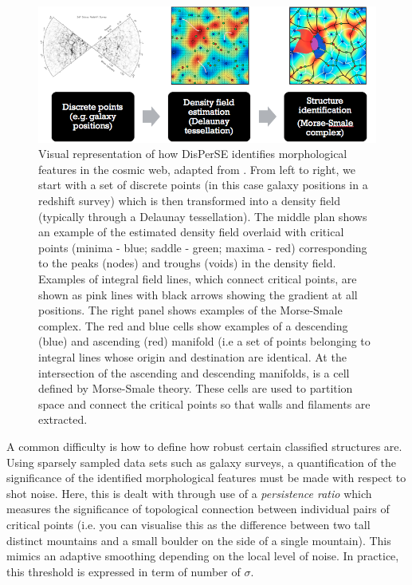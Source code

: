 \begin{figure}
    \centering
	\includegraphics[width=\linewidth]{thesis/latex/introduction/disperse_visual.png}
    \caption{Visual representation of how DisPerSE identifies morphological features in the cosmic web, adapted from \citet{sousbie2011a}. From left to right, we start with a set of discrete points (in this case galaxy positions in a redshift survey) which is then transformed into a density field (typically through a Delaunay tessellation). The middle plan shows an example of the estimated density field overlaid with critical points (minima - blue; saddle - green; maxima - red) corresponding to the peaks (nodes) and troughs (voids) in the density field. Examples of integral field lines, which connect critical points, are shown as pink lines with black arrows showing the gradient at all positions. The right panel shows examples of the Morse-Smale complex. The red and blue cells show examples of a descending (blue) and ascending (red) manifold (i.e a set of points belonging to integral lines whose origin and destination are identical. At the intersection of the ascending and descending manifolds, is a cell defined by Morse-Smale theory. These cells are used to partition space and connect the critical points so that walls and filaments are extracted.}
    \label{fig:disperse_visual}
\end{figure}

A common difficulty is how to define how robust certain classified structures are. Using sparsely sampled data sets such as galaxy surveys, a quantification of the significance of the identified morphological features must be made with respect to shot noise. Here, this is dealt with through use of a \textit{persistence ratio} which measures the significance of topological connection between individual pairs of critical points (i.e. you can visualise this as the difference between two tall distinct mountains and a small boulder on the side of a single mountain). This mimics an adaptive smoothing depending on the local level of noise. In practice, this threshold is expressed in term of number of $\sigma$.

